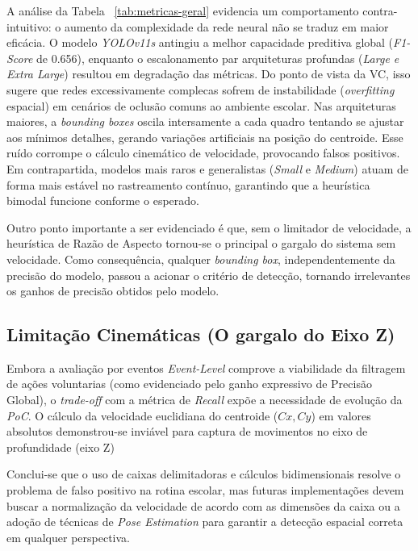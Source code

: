 \documentclass[12pt]{article}
\begin{document}
A análise da Tabela ~\ref{tab:metricas-geral} evidencia um comportamento contra-intuitivo: o aumento da
complexidade da rede neural não se traduz em maior eficácia. O modelo \textit{YOLOv11s} antingiu a melhor 
capacidade preditiva global (\textit{F1-Score} de 0.656), enquanto o escalonamento par arquiteturas 
profundas (\textit{Large e Extra Large}) resultou em degradação das métricas. Do ponto de vista da VC, isso
sugere que redes excessivamente complecas sofrem de instabilidade (\textit{overfitting} espacial) em cenários
de oclusão comuns ao ambiente escolar. Nas arquiteturas maiores, a \textit{bounding boxes} oscila intersamente
a cada quadro tentando se ajustar aos mínimos detalhes, gerando variações artificiais na posição do centroide.
Esse ruído corrompe o cálculo cinemático de velocidade, provocando falsos positivos. Em contrapartida, modelos
mais raros e generalistas (\textit{Small} e \textit{Medium}) atuam de forma mais estável no rastreamento contínuo,
garantindo que a heurística bimodal funcione conforme o esperado.


Outro ponto importante a ser evidenciado é que, sem o limitador de velocidade, a heurística  de Razão de Aspecto
tornou-se o principal o gargalo do sistema sem velocidade. Como consequência, qualquer \textit{bounding box},
independentemente da precisão do modelo, passou a acionar o critério de detecção, tornando irrelevantes os
ganhos de precisão obtidos pelo modelo.

\subsection{Limitação Cinemáticas (O gargalo do Eixo Z)}

Embora a avaliação por eventos \textit{Event-Level} comprove a viabilidade da filtragem de ações voluntarias
(como evidenciado pelo ganho expressivo de Precisão Global), o \textit{trade-off} com a métrica de
\textit{Recall} expõe a necessidade de evolução da \textit{PoC}. O cálculo da velocidade euclidiana do
centroide ($Cx, Cy$) em valores absolutos demonstrou-se inviável para captura de movimentos no eixo de
profundidade (eixo Z)

Conclui-se que o uso de caixas delimitadoras e cálculos bidimensionais resolve o problema de falso positivo
na rotina escolar, mas futuras implementações devem buscar a normalização da velocidade de acordo com as 
dimensões da caixa ou a adoção de técnicas de \textit{Pose Estimation} para garantir a detecção espacial
correta em qualquer perspectiva.
\end{document}
